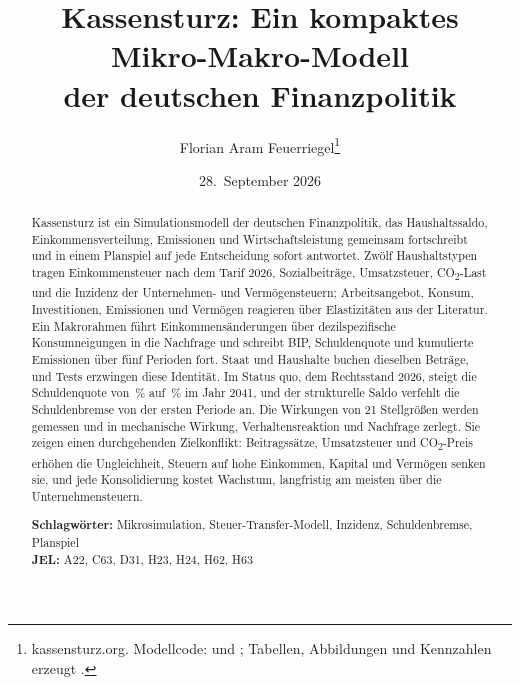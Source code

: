 \documentclass[11pt,a4paper]{article}
\title{Kassensturz: Ein kompaktes Mikro-Makro-Modell\\der deutschen Finanzpolitik}
\author{Florian Aram Feuerriegel\thanks{kassensturz.org. Modellcode:
  \datei{js/rechner/} und \datei{js/data.js}; Tabellen, Abbildungen und
  Kennzahlen erzeugt \datei{docs/modell/messung.js}.}}
\date{28.~September 2026}
\newcommand{\COz}{CO\textsubscript{2}}
\begin{document}
\maketitle

\begin{abstract}
\noindent Kassensturz ist ein Simulationsmodell der deutschen Finanzpolitik,
das Haushaltssaldo, Einkommensverteilung, Emissionen und Wirtschaftsleistung
gemeinsam fortschreibt und in einem Planspiel auf jede Entscheidung sofort
antwortet. Zwölf Haushaltstypen tragen Einkommensteuer nach dem Tarif 2026,
Sozialbeiträge, Umsatzsteuer, \COz-Last und die Inzidenz der Unternehmen- und
Vermögensteuern; Arbeitsangebot, Konsum, Investitionen, Emissionen und
Vermögen reagieren über Elastizitäten aus der Literatur. Ein Makrorahmen führt
Einkommensänderungen über dezilspezifische Konsumneigungen in die Nachfrage
und schreibt BIP, Schuldenquote und kumulierte Emissionen über fünf Perioden
fort. Staat und Haushalte buchen dieselben Beträge, und Tests erzwingen diese
Identität. Im Status quo, dem Rechtsstand 2026, steigt die Schuldenquote von
\SQschuldStart\,\% auf \SQschuldEnde\,\% im Jahr 2041, und der strukturelle
Saldo verfehlt die Schuldenbremse von der ersten Periode an. Die Wirkungen von
21 Stellgrößen werden gemessen und in mechanische Wirkung, Verhaltensreaktion und
Nachfrage zerlegt. Sie zeigen einen durchgehenden Zielkonflikt:
Beitragssätze, Umsatzsteuer und \COz-Preis erhöhen die Ungleichheit, Steuern auf
hohe Einkommen, Kapital und Vermögen senken sie, und jede Konsolidierung
kostet Wachstum, langfristig am meisten über die Unternehmensteuern.

\medskip
\noindent\textbf{Schlagwörter:} Mikrosimulation, Steuer-Transfer-Modell,
Inzidenz, Schuldenbremse, Planspiel\\
\textbf{JEL:} A22, C63, D31, H23, H24, H62, H63
\end{abstract}








\printbibliography[title=Literatur]

\clearpage
\appendix
{}

\end{document}

